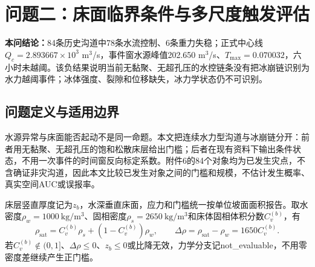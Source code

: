 \section{问题二：床面临界条件与多尺度触发评估}
\noindent\textbf{本问结论：}84条历史沟道中78条水流控制、6条重力失稳；正式中心线$Q_c=2.893667\times10^3$ m$^3$/s，事件窗水源峰值202.650 m$^3$/s、$T_{\max}=0.070032$，六小时未越阈。该负结果说明当前无黏聚、无超孔压的水控链条没有把冰崩链识别为水力越阈事件；冰体强度、裂隙和位移缺失，冰力学状态仍不可识别。

\subsection{问题定义与适用边界}
水源异常与床面能否起动不是同一命题。本文把连续水力型沟道与冰崩链分开：前者用无黏聚、无超孔压的饱和松散床层给出门槛；后者在现有资料下输出条件状态，不用一次事件的时间窗反向标定系数。附件6的84个对象均为已发生灾点，不含确证非灾沟道，因此本文比较已发生对象之间的门槛和规模，不估计发生概率、真实空间AUC或误报率。

床层竖直厚度记为$z_b$，水深垂直床面，应力和门槛统一按单位坡面面积报告。取水密度$\rho_w=1000\ \mathrm{kg/m^3}$、固相密度$\rho_s=2650\ \mathrm{kg/m^3}$和床体固相体积分数$C_v^{(b)}$，有
\begin{equation}
\rho_{\mathrm{sat}}=C_v^{(b)}\rho_s+(1-C_v^{(b)})\rho_w,
\qquad
\Delta\rho=\rho_{\mathrm{sat}}-\rho_w=1650C_v^{(b)}.
\end{equation}
若$C_v^{(b)}\notin(0,1]$、$\Delta\rho\le0$、$z_b\le0$或比降无效，力学分支记not\_evaluable，不用零密度差继续产生正门槛。


